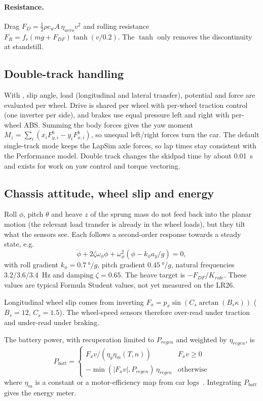 \documentclass[11pt]{article}
\begin{document}
\paragraph{Resistance.} Drag $F_D = \tfrac12\rho c_w A\,\eta_{aero} v^2$ and rolling resistance
$F_R = f_r (mg + F_{DF})\tanh(v/0.2)$. The $\tanh$ only removes the discontinuity at standstill.

\subsection{Double-track handling}
With , slip angle, load (longitudinal and lateral transfer), potential and force are
evaluated per wheel. Drive is shared per wheel with per-wheel traction control (one inverter per side), and brakes
use equal pressure left and right with per-wheel ABS. Summing the body forces gives the yaw moment
$M_z=\sum_i (x_i F_{y,i}^b - y_i F_{x,i}^b)$, so unequal left/right forces turn the car. The default single-track
mode keeps the LapSim axle forces, so lap times stay consistent with the Performance model. Double track changes
the skidpad time by about \SI{0.01}{s} and exists for work on yaw control and torque vectoring.

\subsection{Chassis attitude, wheel slip and energy}
Roll $\phi$, pitch $\theta$ and heave $z$ of the sprung mass do not feed back into the planar motion (the
relevant load transfer is already in the wheel loads), but they tilt what the sensors see. Each follows a
second-order response towards a steady state, e.g.
\begin{equation}
\ddot\phi + 2\zeta\omega_\phi\dot\phi + \omega_\phi^2(\phi - k_\phi a_y/g) = 0,
\end{equation}
with roll gradient $k_\phi=\SI{0.7}{\degree/g}$, pitch gradient $\SI{0.45}{\degree/g}$, natural frequencies
3.2/3.6/\SI{3.4}{Hz} and damping $\zeta=0.65$. The heave target is $-F_{DF}/K_{ride}$. These values are typical
Formula Student values, not yet measured on the LR26.

Longitudinal wheel slip comes from inverting $F_x = p_x\sin(C_s\arctan(B_s\kappa))$ ($B_s=12$, $C_s=1.5$). The
wheel-speed sensors therefore over-read under traction and under-read under braking.

The battery power, with recuperation limited to $P_{regen}$ and weighted by $\eta_{regen}$, is
\begin{equation}
P_{batt} = \begin{cases} F_x v / (\eta_g \eta_m(T,n)) & F_x v \ge 0\\ -\min(|F_x v|, P_{regen})\,\eta_{regen} & \text{otherwise}\end{cases}
\end{equation}
where $\eta_m$ is a constant or a motor-efficiency map from car logs~\cite{perflab}. Integrating $P_{batt}$ gives
the energy meter.
\end{document}
